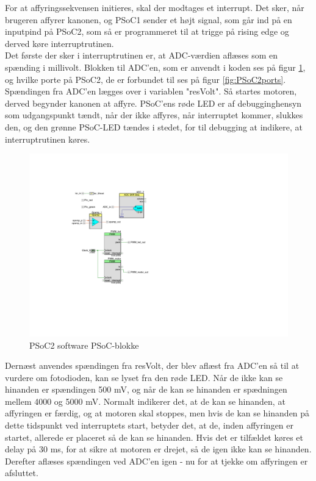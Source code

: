 For at affyringssekvensen initieres, skal der modtages et interrupt. Det sker, når brugeren affyrer kanonen, og PSoC1 sender et højt signal, som går ind på en inputpind på PSoC2, som så er programmeret til at trigge på rising edge og derved køre interruptrutinen. \\
Det første der sker i interruptrutinen er, at ADC-værdien aflæses som en spænding i millivolt. Blokken til ADC'en, som er anvendt i koden ses på figur \ref{fig:PSoC2blokke}, og hvilke porte på PSoC2, de er forbundet til ses på figur \ref{fig:PSoC2ports}. Spændingen fra ADC'en lægges over i variablen "resVolt". Så startes motoren, derved begynder kanonen at affyre. PSoC'ens røde LED er af debugginghensyn som udgangspunkt tændt, når der ikke affyres, når interruptet kommer, slukkes den, og den grønne PSoC-LED tændes i stedet, for til debugging at indikere, at interruptrutinen køres.
 

\begin{figure}[H]
	\centering
	\includegraphics[width=2.7\textwidth, trim={5cm 5.7cm 0 4.3cm}]{Afsnit/DesignOgImplementering/images/PSoC2blokke}
	\caption{PSoC2 software PSoC-blokke} 
	\label{fig:PSoC2blokke}
\end{figure}


Dernæst anvendes spændingen fra resVolt, der blev aflæst fra ADC'en så til at vurdere om fotodioden, kan se lyset fra den røde LED. Når de ikke kan se hinanden er spændingen 500 mV, og når de kan se hinanden er spædningen mellem 4000 og 5000 mV. Normalt indikerer det, at de kan se hinanden, at affyringen er færdig, og at motoren skal stoppes, men hvis de kan se hinanden på dette tidspunkt ved interruptets start, betyder det, at de, inden affyringen er startet, allerede er placeret så de kan se hinanden. Hvis det er tilfældet køres et delay på 30 ms, for at sikre at motoren er drejet, så de igen ikke kan se hinanden. Derefter aflæses spændingen ved ADC'en igen - nu for at tjekke om affyringen er afsluttet. 

